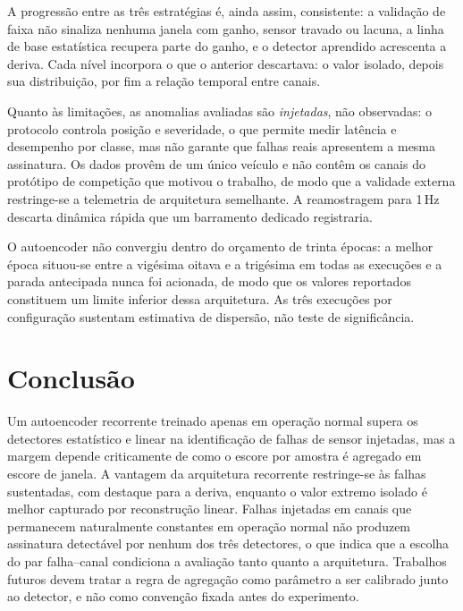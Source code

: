 \documentclass[conference]{IEEEtran}
\begin{document}
A progressão entre as três estratégias é, ainda assim, consistente: a validação de faixa não sinaliza nenhuma janela com ganho, sensor travado ou lacuna, a linha de base estatística recupera parte do ganho, e o detector aprendido acrescenta a deriva.
Cada nível incorpora o que o anterior descartava: o valor isolado, depois sua distribuição, por fim a relação temporal entre canais.


Quanto às limitações, as anomalias avaliadas são \emph{injetadas}, não observadas: o protocolo controla posição e severidade, o que permite medir latência e desempenho por classe, mas não garante que falhas reais apresentem a mesma assinatura.
Os dados provêm de um único veículo e não contêm os canais do protótipo de competição que motivou o trabalho, de modo que a validade externa restringe-se a telemetria de arquitetura semelhante.
A reamostragem para 1\,Hz descarta dinâmica rápida que um barramento dedicado registraria.

O autoencoder não convergiu dentro do orçamento de trinta épocas: a melhor época situou-se entre a vigésima oitava e a trigésima em todas as execuções e a parada antecipada nunca foi acionada, de modo que os valores reportados constituem um limite inferior dessa arquitetura.
As três execuções por configuração sustentam estimativa de dispersão, não teste de significância.

\section{Conclusão}

Um autoencoder recorrente treinado apenas em operação normal supera os detectores estatístico e linear na identificação de falhas de sensor injetadas, mas a margem depende criticamente de como o escore por amostra é agregado em escore de janela.
A vantagem da arquitetura recorrente restringe-se às falhas sustentadas, com destaque para a deriva, enquanto o valor extremo isolado é melhor capturado por reconstrução linear.
Falhas injetadas em canais que permanecem naturalmente constantes em operação normal não produzem assinatura detectável por nenhum dos três detectores, o que indica que a escolha do par falha--canal condiciona a avaliação tanto quanto a arquitetura.
Trabalhos futuros devem tratar a regra de agregação como parâmetro a ser calibrado junto ao detector, e não como convenção fixada antes do experimento.



\end{document}
